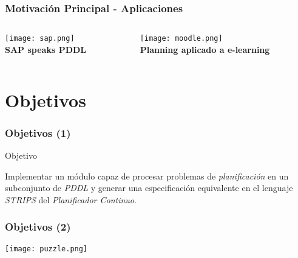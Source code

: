 \documentclass[bigger]{beamer}
\begin{document}
\begin{frame}
\frametitle{Motivación Principal - Aplicaciones}
\label{sec-1.12}
\begin{columns}
\begin{column}{0.4\textwidth}
\label{sec-1.12.1}

\begin{center} \texttt{[image: sap.png]}\\\caption{\textbf{SAP speaks PDDL}}\end{center}
    
\end{column}
\begin{column}{0.4\textwidth}
\label{sec-1.12.2}

\begin{center} \texttt{[image: moodle.png]}\\\caption{\textbf{Planning aplicado a e-learning}}\end{center}
\end{column}
\end{columns}
\end{frame}
\section{Objetivos}
\label{sec-2}
\begin{frame}
\frametitle{Objetivos (1)}
\label{sec-2.1}
\begin{block}{Objetivo}
\label{sec-2.1.1}

Implementar un módulo capaz de procesar problemas de \emph{pla\-ni\-fi\-ca\-ción}
en un subconjunto de \emph{PDDL} y generar una especificación equivalente
en el lenguaje \emph{STRIPS} del \emph{Planificador Continuo}.
\end{block}
\end{frame}
\begin{frame}
\frametitle{Objetivos (2)}
\label{sec-2.2}

\begin{center} \texttt{[image: puzzle.png]} \end{center}
\end{frame}
\end{document}
